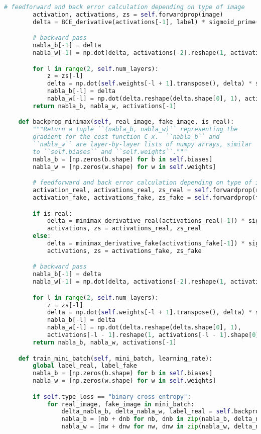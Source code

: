 \begin{lstlisting}[language=Python, caption=Codi final pel discriminador]
		# feedforward and back error calculation depending on type of image
		activation, activations, zs = self.forwardprop(image)
		delta = BCE_derivative(activations[-1], label) * sigmoid_prime(zs[-1])

		# backward pass
		nabla_b[-1] = delta
		nabla_w[-1] = np.dot(delta, activations[-2].reshape(1, activations[-2].shape[0]))

		for l in range(2, self.num_layers):
			z = zs[-l]
			delta = np.dot(self.weights[-l + 1].transpose(), delta) * sigmoid_prime(z)
			nabla_b[-l] = delta
			nabla_w[-l] = np.dot(delta.reshape(delta.shape[0], 1), activations[-l - 1].reshape(1, activations[-l - 1].shape[0]))
		return nabla_b, nabla_w, activations[-1]

	def backprop_minimax(self, real_image, fake_image, is_real):
		"""Return a tuple ``(nabla_b, nabla_w)`` representing the
		gradient for the cost function C_x.  ``nabla_b`` and
		``nabla_w`` are layer-by-layer lists of numpy arrays, similar
		to ``self.biases`` and ``self.weights``."""
		nabla_b = [np.zeros(b.shape) for b in self.biases]
		nabla_w = [np.zeros(w.shape) for w in self.weights]

		# feedforward and back error calculation depending on type of image
		activation_real, activations_real, zs_real = self.forwardprop(real_image)
		activation_fake, activations_fake, zs_fake = self.forwardprop(fake_image)

		if is_real:
			delta = minimax_derivative_real(activations_real[-1]) * sigmoid_prime(zs_real[-1])
			activations, zs = activations_real, zs_real
		else:
			delta = minimax_derivative_fake(activations_fake[-1]) * sigmoid_prime(zs_fake[-1])
			activations, zs = activations_fake, zs_fake

		# backward pass
		nabla_b[-1] = delta
		nabla_w[-1] = np.dot(delta, activations[-2].reshape(1, activations[-2].shape[0]))

		for l in range(2, self.num_layers):
			z = zs[-l]
			delta = np.dot(self.weights[-l + 1].transpose(), delta) * sigmoid_prime(z)
			nabla_b[-l] = delta
			nabla_w[-l] = np.dot(delta.reshape(delta.shape[0], 1),
			activations[-l - 1].reshape(1, activations[-l - 1].shape[0]))
		return nabla_b, nabla_w, activations[-1]

	def train_mini_batch(self, mini_batch, learning_rate):
		global label_real, label_fake
		nabla_b = [np.zeros(b.shape) for b in self.biases]
		nabla_w = [np.zeros(w.shape) for w in self.weights]

		if self.type_loss == "binary cross entropy":
			for real_image, fake_image in mini_batch:
				delta_nabla_b, delta_nabla_w, label_real = self.backprop_bce(real_image, np.array([1.]))
				nabla_b = [nb + dnb for nb, dnb in zip(nabla_b, delta_nabla_b)]
				nabla_w = [nw + dnw for nw, dnw in zip(nabla_w, delta_nabla_w)]


\end{lstlisting}
